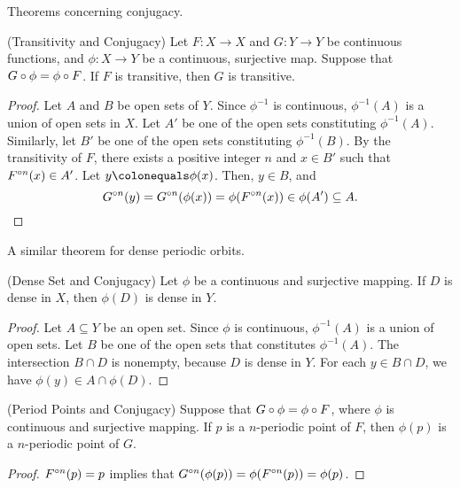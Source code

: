 \documentclass[12pt,draft,twoside]{book}
\begin{document}
  Theorems concerning conjugacy.
  \begin{theorem}
    (Transitivity and Conjugacy) 
    Let $F: X \to X$ and $G: Y \to Y$ be continuous functions, and $\phi: X \to Y$ be a continuous, surjective map.
    Suppose that $G \circ \phi = \phi \circ F$.
    If $F$ is transitive, then $G$ is transitive.
    \label{thm:conj-trans}
    \begin{proof}
      Let $A$ and $B$ be open sets of $Y$.
      Since $\phi^{-1}$ is continuous, $\phi^{-1}(A)$ is a union of open sets in $X$.
      Let $A'$ be one of the open sets constituting $\phi^{-1}(A)$.
      Similarly, let $B'$ be one of the open sets constituting $\phi^{-1}(B)$.
      By the transitivity of $F$, there exists a positive integer $n$ and $x \in B'$ such that $F^{\circ n}(x)\in A'$.
      Let $y \ceq \phi(x)$.
      Then, $y \in B$, and 
      \begin{equation*}
        G^{\circ n}(y) 
        = G^{\circ n}(\phi(x))
        = \phi(F^{\circ n}(x)) \in \phi(A') \subseteq A.
      \end{equation*}
      \end{proof}
  \end{theorem}
  A similar theorem for dense periodic orbits.
  \begin{theorem}
    (Dense Set and Conjugacy) 
    Let $\phi$ be a continuous and surjective mapping.
    If $D$ is dense in $X$, then $\phi(D)$ is dense in $Y$.
    \label{thm:conj-dense}
    \begin{proof}
      Let $A \subseteq Y$ be an open set.
      Since $\phi$ is continuous, $\phi^{-1} (A)$ is a union of open sets.
      Let $B$ be one of the open sets that constitutes $\phi^{-1}(A)$.
      The intersection $B \cap D$ is nonempty, because $D$ is dense in $Y$.
      For each $y \in B \cap D$, we have $\phi(y) \in A \cap \phi(D)$.
    \end{proof}
  \end{theorem}
  \begin{theorem}
    (Period Points and Conjugacy)
    Suppose that $G \circ \phi = \phi \circ F$, where $\phi$ is continuous and surjective mapping.
    If $p$ is a $n$-periodic point of $F$, then $\phi(p)$ is a $n$-periodic point of $G$.
    \label{thm:conj-per}
    \begin{proof}
      $F^{\circ n}(p) = p$ implies that $G^{\circ n}(\phi(p)) = \phi(F^{\circ n}(p)) = \phi(p)$.
    \end{proof}
  \end{theorem}
\end{document}
